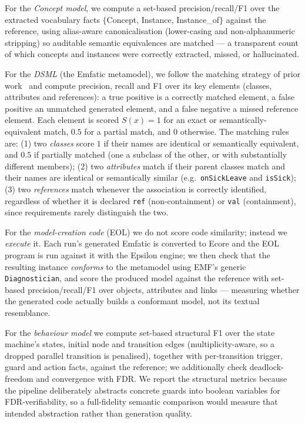 For the \emph{Concept model}, we compute a set-based precision/recall/F1 over the extracted vocabulary facts $\{$Concept, Instance, Instance\_of$\}$ against the reference, using alias-aware canonicalisation (lower-casing and non-alphanumeric stripping) so auditable semantic equivalences are matched --- a transparent count of which concepts and instances were correctly extracted, missed, or hallucinated.

For the \emph{DSML} (the Emfatic metamodel), we follow the matching strategy of prior work~\cite{chen2023comparative} and compute precision, recall and F1 over its key elements (classes, attributes and references): a true positive is a correctly matched element, a false positive an unmatched generated element, and a false negative a missed reference element.
Each element is scored $S(x)=1$ for an exact or semantically-equivalent match, $0.5$ for a partial match, and $0$ otherwise.
The matching rules are: (1) two \emph{classes} score $1$ if their names are identical or semantically equivalent, and $0.5$ if partially matched (one a subclass of the other, or with substantially different members); (2) two \emph{attributes} match if their parent classes match and their names are identical or semantically similar (e.g.\ \texttt{onSickLeave} and \texttt{isSick}); (3) two \emph{references} match whenever the association is correctly identified, regardless of whether it is declared \texttt{ref} (non-containment) or \texttt{val} (containment), since requirements rarely distinguish the two.

For the \emph{model-creation code} (EOL) we do not score code similarity; instead we \emph{execute} it.
Each run's generated Emfatic is converted to Ecore and the EOL program is run against it with the Epsilon engine; we then check that the resulting instance \emph{conforms} to the metamodel using EMF's generic \texttt{Diagnostician}, and score the produced model against the reference with set-based precision/recall/F1 over objects, attributes and links --- measuring whether the generated code actually builds a conformant model, not its textual resemblance.

For the \emph{behaviour model} we compute set-based structural F1 over the state machine's states, initial node and transition edges (multiplicity-aware, so a dropped parallel transition is penalised), together with per-transition trigger, guard and action facts, against the reference; we additionally check deadlock-freedom and convergence with FDR.
We report the structural metrics because the pipeline deliberately abstracts concrete guards into boolean variables for FDR-verifiability, so a full-fidelity semantic comparison would measure that intended abstraction rather than generation quality.

